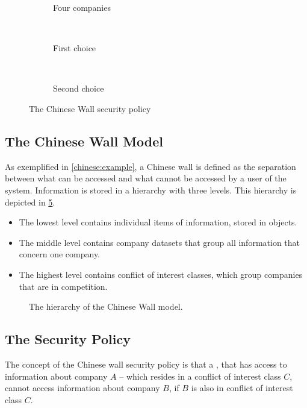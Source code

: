 \begin{figure}
\centering
    \begin{subfigure}[t]{0.3\textwidth}
        \resizebox{\linewidth}{!}{}
        \caption{Four companies}
        \label{chinese:illu:situation}
    \end{subfigure}
    ~
    \begin{subfigure}[t]{0.3\textwidth}
        \resizebox{\linewidth}{!}{}
        \caption{First choice}
        \label{chinese:illu:choice1}
    \end{subfigure}
    ~
    \begin{subfigure}[t]{0.3\textwidth}
        \resizebox{\linewidth}{!}{}
        \caption{Second choice}
        \label{chinese:illu:choice2}
    \end{subfigure}
    \caption{The Chinese Wall security policy}\label{chinese:illu}
\end{figure}


\subsection*{The Chinese Wall Model}
As exemplified in \cref{chinese:example}, a Chinese wall is defined as the separation between what can be accessed and what cannot be accessed by a user of the system.
Information is stored in a hierarchy with three levels. 
This hierarchy is depicted in \cref{china:hierarchy}.

\begin{itemize}
	\item The lowest level contains individual items of information, stored in objects.
	\item The middle level contains company datasets that group all information that concern one company. 
	\item The highest level contains conflict of interest classes, which group companies that are in competition.
\end{itemize}

\begin{figure}[h]
  \resizebox{\textwidth}{!}{
	}
	\caption{The hierarchy of the Chinese Wall model.}
	\label{china:hierarchy}
\end{figure}

\subsection{The Security Policy}
The concept of the Chinese wall security policy is that a \principal{}, that has access to information about company $A$ -- which resides in a conflict of interest class $C$, cannot access information about company $B$, if $B$ is also in conflict of interest class $C$.

